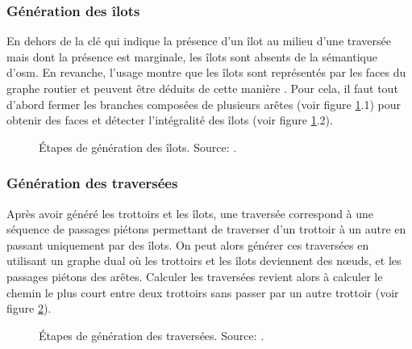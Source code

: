 \subsubsection{Génération des îlots}

En dehors de la clé  qui indique la présence d'un îlot au milieu d'une traversée mais dont la présence est marginale, les îlots sont absents de la sémantique d'\gls{osm}. En revanche, l'usage montre que les îlots sont représentés par les faces du graphe routier et peuvent être déduits de cette manière \citep{Vitalis2022}. Pour cela, il faut tout d'abord fermer les branches composées de plusieurs arêtes (voir figure \ref{fig:modelisation_calcul_pieton_ilots}.1) pour obtenir des faces et détecter l'intégralité des îlots (voir figure \ref{fig:modelisation_calcul_pieton_ilots}.2).

\begin{figure}[ht]
    \centering
    \caption[Génération d'îlots]{Étapes de génération des îlots. Source: \citep{Kalsron2022}.}
    \label{fig:modelisation_calcul_pieton_ilots}
\end{figure}

\subsubsection{Génération des traversées}

Après avoir généré les trottoirs et les îlots, une traversée correspond à une séquence de passages piétons permettant de traverser d'un trottoir à un autre en passant uniquement par des îlots. On peut alors générer ces traversées en utilisant un graphe dual où les trottoirs et les îlots deviennent des nœuds, et les passages piétons des arêtes. Calculer les traversées revient alors à calculer le chemin le plus court entre deux trottoirs sans passer par un autre trottoir (voir figure \ref{fig:modelisation_calcul_pieton_traversees}).

\begin{figure}[ht]
    \centering
    \caption[Génération de traversées]{Étapes de génération des traversées. Source: \citep{Kalsron2022}.}
    \label{fig:modelisation_calcul_pieton_traversees}
\end{figure}

